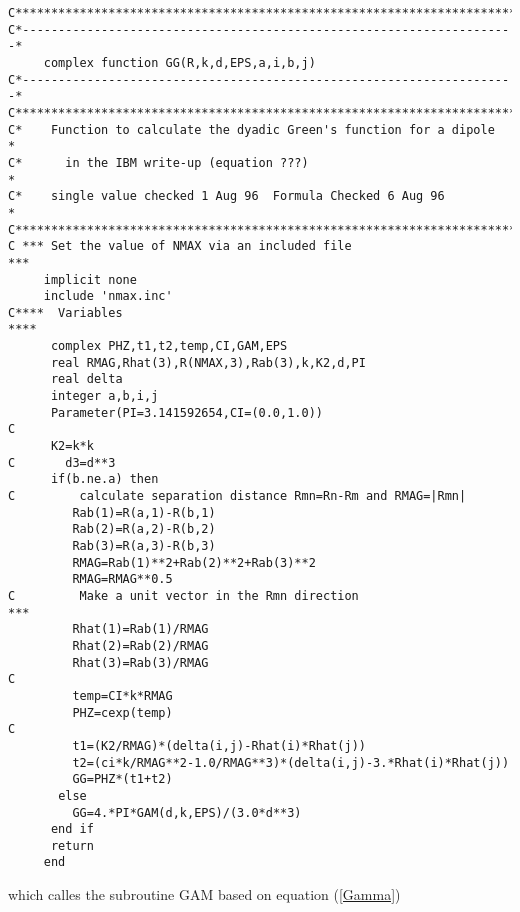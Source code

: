 \documentclass{article}
\begin{document}
\begin{verbatim}
C***********************************************************************
C*---------------------------------------------------------------------*
     complex function GG(R,k,d,EPS,a,i,b,j)      
C*---------------------------------------------------------------------*      
C***********************************************************************
C*    Function to calculate the dyadic Green's function for a dipole   *
C*      in the IBM write-up (equation ???)                             *
C*    single value checked 1 Aug 96  Formula Checked 6 Aug 96          *
C***********************************************************************
C *** Set the value of NMAX via an included file                     ***  
     implicit none
     include 'nmax.inc'
C****  Variables                                                    ****
      complex PHZ,t1,t2,temp,CI,GAM,EPS
      real RMAG,Rhat(3),R(NMAX,3),Rab(3),k,K2,d,PI
      real delta
      integer a,b,i,j
      Parameter(PI=3.141592654,CI=(0.0,1.0))
C
      K2=k*k 
C       d3=d**3
      if(b.ne.a) then
C         calculate separation distance Rmn=Rn-Rm and RMAG=|Rmn|
         Rab(1)=R(a,1)-R(b,1)
         Rab(2)=R(a,2)-R(b,2)
         Rab(3)=R(a,3)-R(b,3)
         RMAG=Rab(1)**2+Rab(2)**2+Rab(3)**2    
         RMAG=RMAG**0.5
C         Make a unit vector in the Rmn direction                    ***
         Rhat(1)=Rab(1)/RMAG 
         Rhat(2)=Rab(2)/RMAG
         Rhat(3)=Rab(3)/RMAG
C                          
         temp=CI*k*RMAG  
         PHZ=cexp(temp) 
C         
         t1=(K2/RMAG)*(delta(i,j)-Rhat(i)*Rhat(j)) 
         t2=(ci*k/RMAG**2-1.0/RMAG**3)*(delta(i,j)-3.*Rhat(i)*Rhat(j))
         GG=PHZ*(t1+t2)  
       else
         GG=4.*PI*GAM(d,k,EPS)/(3.0*d**3)
      end if        
      return
     end
\end{verbatim}%

which calles the subroutine GAM based on equation (\ref{Gamma})
\end{document}
